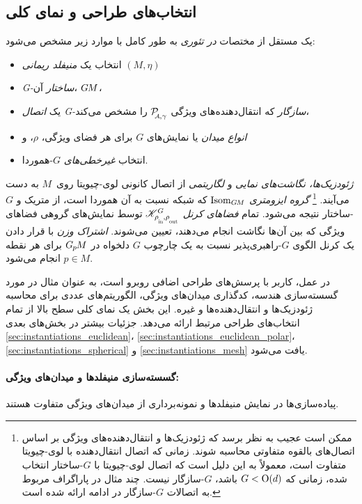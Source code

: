 \subsection*{انتخاب‌های طراحی و نمای کلی}
\label{sec:instantiations_taxonomy}

یک \CNN مستقل از مختصات \emph{در تئوری} به طور کامل با موارد زیر مشخص می‌شود:
\begin{itemize}
	\item[1)] انتخاب یک \emph{منیفلد ریمانی} $(M,\eta)$
	\item[2)] \emph{G-ساختار} آن، $G\mkern-1.4muM$،
	\item[3)] یک \emph{اتصال G-سازگار} که انتقال‌دهنده‌های ویژگی $\PAgamma$ را مشخص می‌کند،
	\item[4)] \emph{انواع میدان} یا نمایش‌های $G$ برای هر فضای ویژگی، $\rho$، و
	\item[5)] انتخاب \emph{غیرخطی‌های} $G$-هموردا.
\end{itemize}
\emph{ژئودزیک‌ها، نگاشت‌های نمایی} و \emph{لگاریتمی} از اتصال کانونی لوی-چیویتا روی~$M$ به دست می‌آیند.%
\footnote{
	ممکن است عجیب به نظر برسد که ژئودزیک‌ها و انتقال‌دهنده‌های ویژگی بر اساس اتصال‌های بالقوه متفاوتی محاسبه شوند.
	زمانی که اتصال انتقال‌دهنده با لوی-چیویتا متفاوت است، معمولاً به این دلیل است که اتصال لوی-چیویتا با $G$-ساختار انتخاب شده، زمانی که $G<\operatorname{O}(d)$ باشد، $G$-سازگار نیست.
	چند مثال در پاراگراف مربوط به اتصالات $G$-سازگار در ادامه ارائه شده است.
}
\emph{گروه ایزومتری} $\operatorname{Isom}_{G\mkern-1.4muM}$ که شبکه نسبت به آن هموردا است، از متریک و $G$-ساختار نتیجه می‌شود.
تمام \emph{فضاهای کرنل} $\KG$ توسط نمایش‌های گروهی فضاهای ویژگی که بین آن‌ها نگاشت انجام می‌دهند، تعیین می‌شوند.
\emph{اشتراک وزن} با قرار دادن یک کرنل الگوی $G$-راهبری‌پذیر نسبت به یک چارچوب $G$ دلخواه در $G_{\mkern-1.3mu p}\mkern-1.2muM$ برای هر نقطه $p\in M$ انجام می‌شود.

در عمل، کاربر با پرسش‌های طراحی اضافی روبرو است، به عنوان مثال در مورد گسسته‌سازی هندسه، کدگذاری میدان‌های ویژگی، الگوریتم‌های عددی برای محاسبه ژئودزیک‌ها و انتقال‌دهنده‌ها و غیره.
این بخش یک نمای کلی سطح بالا از تمام انتخاب‌های طراحی مرتبط ارائه می‌دهد.
جزئیات بیشتر در بخش‌های بعدی \ref{sec:instantiations_euclidean}، \ref{sec:instantiations_euclidean_polar}، \ref{sec:instantiations_spherical} و \ref{sec:instantiations_mesh} یافت می‌شود.

\paragraph{گسسته‌سازی منیفلدها و میدان‌های ویژگی:}
پیاده‌سازی‌ها در نمایش منیفلدها و نمونه‌برداری از میدان‌های ویژگی متفاوت هستند.

